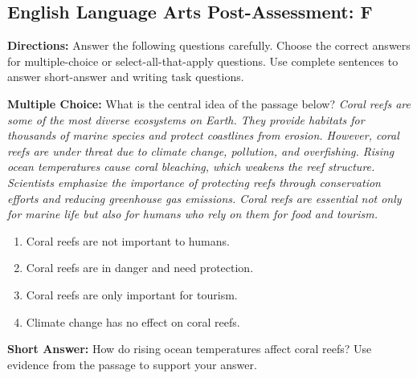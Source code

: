 \documentclass[12pt]{article}
\begin{document}
\subsection*{English Language Arts Post-Assessment: F}
\onehalfspacing

\begin{tcolorbox}[colframe=black!50, colback=white, title=Assessment Directions]
\textbf{Directions:} Answer the following questions carefully. Choose the correct answers for multiple-choice or select-all-that-apply questions. Use complete sentences to answer short-answer and writing task questions.
\end{tcolorbox}

\begin{tcolorbox}[colframe=black!50, colback=white, title=Question 1]
\textbf{Multiple Choice:} What is the central idea of the passage below?  
\textit{Coral reefs are some of the most diverse ecosystems on Earth. They provide habitats for thousands of marine species and protect coastlines from erosion. However, coral reefs are under threat due to climate change, pollution, and overfishing. Rising ocean temperatures cause coral bleaching, which weakens the reef structure. Scientists emphasize the importance of protecting reefs through conservation efforts and reducing greenhouse gas emissions. Coral reefs are essential not only for marine life but also for humans who rely on them for food and tourism.}  
\begin{enumerate}[label=(\Alph*)]
\item Coral reefs are not important to humans.  
\item Coral reefs are in danger and need protection.  
\item Coral reefs are only important for tourism.  
\item Climate change has no effect on coral reefs.  
\end{enumerate}
\end{tcolorbox}

\begin{tcolorbox}[colframe=black!50, colback=white, title=Question 2]
\textbf{Short Answer:} How do rising ocean temperatures affect coral reefs? Use evidence from the passage to support your answer.  

\vspace{2em}
\\[0.8cm] \underline{\hspace{15.8cm}}  
    \\[0.8cm] \underline{\hspace{15.8cm}}  
\end{tcolorbox}
\end{document}

